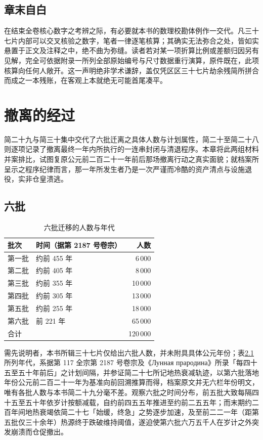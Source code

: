 \section{章末自白}

在结束全卷核心数字之考辨之际，有必要就本书的数理校勘体例作一交代。凡三十七片内部可以交叉核验之数字，笔者一律逐笔核算；其确实无法弥合之处，皆如实悬置于正文及注释之中，绝不曲为弥缝。读者若对某一项折算比例或差额归因另有见解，完全可依据附录一所列全部原始编号与尺寸数据重行演算，原件既在，此项核算向任何人敞开。这一声明绝非学术谦辞，盖仅凭区区三十七片劫余残简所拼合而成之一本残账，在客观上本就绝无可能首尾凑平。

\chapter{撤离的经过}

简二十九与简三十集中交代了六批迁离之具体人数与计划属性，简二十至简二十八则逐项记录了撤离最终一年内所执行的一连串封闭与清退程序。本章将此两组材料并案排比，试图复原公元前二百二十一年前后那场撤离行动之真实面貌；就档案所呈示之程序纪律而言，那一年所发生者乃是一次严谨而冷酷的资产清点与设施退役，实非仓皇溃逃。

\section{六批}

\begin{table}[htbp]
\centering
\small
\caption{六批迁移的人数与年代}
\label{tab:six}
\begin{tabular}{@{}llr@{}}
\toprule
批次 & 时间（据第 2187 号卷宗） & 人数\\
\midrule
第一批 & 约前 455 年 & 6\,000\\
第二批 & 约前 405 年 & 8\,000\\
第三批 & 约前 355 年 & 10\,000\\
第四批 & 约前 305 年 & 13\,000\\
第五批 & 约前 255 年 & 18\,000\\
第六批 & 前 221 年 & 65\,000\\
\midrule
合计 & & 120\,000\\
\bottomrule
\end{tabular}
\end{table}

需先说明者，本书所辑三十七片仅给出六批人数，并未附具具体公元年份；表\ref{tab:six}所列年代，系据第 117 全宗第 2187 号卷宗及《Лунная прародина》所录「每四十五至五十年前后」之计划间隔，并参证简二十七所记地热衰减轨迹，以第六批落地年份公元前二百二十一年为基准向前回溯推算而得，档案原文并无六栏年份明文，唯有各批人数与本书简二十九分毫不差。观察六批之时间分布，前五批大致每隔四十五至五十年依岁计按额减载，自约前四五五年推进至约前二五五年；而末期约二百年间地热衰竭依简二十七「始缓，终急」之势逐步加速，及至前二二一年（距第五批仅三十余年）热源终于跌破维持阈值，遂迫使第六批六万五千人在岁计之外突发崩溃而仓促撤出。

